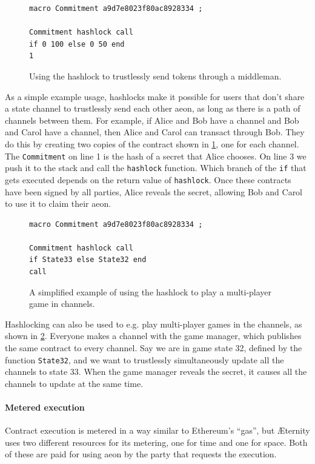 \documentclass[a4paper, 10pt, conference]{ieeeconf}      %
\begin{document}
\begin{draft}
\begin{figure}
\begin{lstlisting}
macro Commitment a9d7e8023f80ac8928334 ;

Commitment hashlock call
if 0 100 else 0 50 end
1
\end{lstlisting}
\caption{Using the hashlock to trustlessly send tokens through a middleman.}
\label{fig:compose}
\end{figure}

As a simple example usage, hashlocks make it possible for users that don't share a state channel to trustlessly send each other aeon, as long as there is a path of channels between them. For example, if Alice and Bob have a channel and Bob and Carol have a channel, then Alice and Carol can transact through Bob. They do this by creating two copies of the contract shown in \cref{fig:compose}, one for each channel. The \texttt{Commitment} on line 1 is the hash of a secret that Alice chooses. On line 3 we push it to the stack and call the \texttt{hashlock} function. Which branch of the \texttt{if} that gets executed depends on the return value of \texttt{hashlock}. Once these contracts have been signed by all parties, Alice reveals the secret, allowing Bob and Carol to use it to claim their aeon.

\begin{figure}
\begin{lstlisting}
macro Commitment a9d7e8023f80ac8928334 ;

Commitment hashlock call
if State33 else State32 end
call
\end{lstlisting}
\caption{A simplified example of using the hashlock to play a multi-player game in channels.}
\label{fig:multigame}
\end{figure}

Hashlocking can also be used to e.g. play multi-player games in the channels, as shown in \cref{fig:multigame}. Everyone makes a channel with the game manager, which publishes the same contract to every channel. Say we are in game state 32, defined by the function \texttt{State32}, and we want to trustlessly simultaneously update all the channels to state 33. When the game manager reveals the secret, it causes all the channels to update at the same time. 


\paragraph{Metered execution}
Contract execution is metered in a way similar to Ethereum's ``gas'', but Æternity uses two different resources for its metering, one for time and one for space. Both of these are paid for using aeon by the party that requests the execution.


\end{draft}
\end{document}
